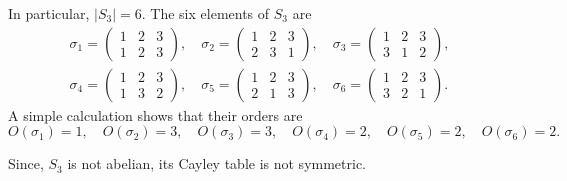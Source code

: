 \documentclass[11pt]{penrose}
\begin{document}
In particular, $|S_3| = 6$. The six elements of $S_3$ are
\begin{gather*}
    \sigma_1 = \begin{pmatrix} 1 & 2 & 3 \\ 1 & 2 & 3 \end{pmatrix}, \quad
    \sigma_2 = \begin{pmatrix} 1 & 2 & 3 \\ 2 & 3 & 1 \end{pmatrix}, \quad
    \sigma_3 = \begin{pmatrix} 1 & 2 & 3 \\ 3 & 1 & 2 \end{pmatrix},\\
    \sigma_4 = \begin{pmatrix} 1 & 2 & 3 \\ 1 & 3 & 2 \end{pmatrix}, \quad
    \sigma_5 = \begin{pmatrix} 1 & 2 & 3 \\ 2 & 1 & 3 \end{pmatrix}, \quad
    \sigma_6 = \begin{pmatrix} 1 & 2 & 3 \\ 3 & 2 & 1 \end{pmatrix}.
\end{gather*}
A simple calculation shows that their orders are
\begin{equation*}
    O(\sigma_1) = 1, \quad
    O(\sigma_2) = 3, \quad
    O(\sigma_3) = 3, \quad
    O(\sigma_4) = 2, \quad
    O(\sigma_5) = 2, \quad
    O(\sigma_6) = 2.
\end{equation*}

Since, $S_3$ is not abelian, its Cayley table is not symmetric.
\end{document}
